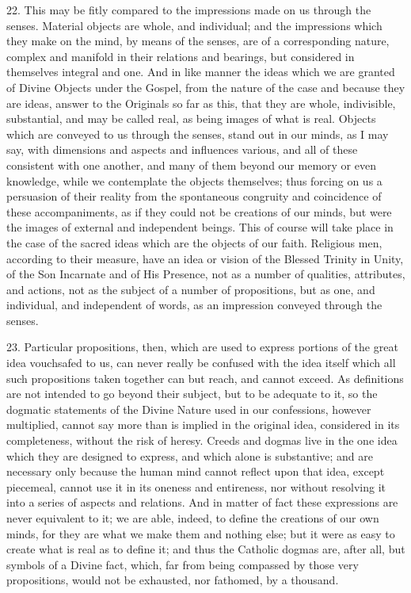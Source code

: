 22. This may be fitly compared to the impressions made on us
through the senses. Material objects are whole, and individual; and
the impressions which they make on the mind, by means of the senses,
are of a corresponding nature, complex and manifold in their relations
and bearings, but considered in themselves integral and one. And in
like manner the ideas which we are granted of Divine Objects under the
Gospel, from the nature of the case and because they are ideas, answer
to the Originals so far as this, that they are whole, indivisible,
substantial, and may be called real, as being images of what is real.
Objects which are conveyed to us through the senses, stand out in our
minds, as I may say, with dimensions and aspects and influences
various, and all of these consistent with one another, and many of
them beyond our memory or even knowledge, while we contemplate the
objects themselves; thus forcing on us a persuasion of their reality
from the spontaneous congruity and coincidence of these
accompaniments, as if they could not be creations of our minds, but
were the images of external and independent beings. This of course
will take place in the case of the sacred ideas which are the objects
of our faith. Religious men, according to their measure, have an idea
or vision of the Blessed Trinity in Unity, of the Son Incarnate and of
His Presence, not as a number of qualities, attributes, and actions,
not as the subject of a number of propositions, but as one, and
individual, and independent of words, as an impression conveyed
through the senses.

23. Particular propositions, then, which are used to express
portions of the great idea vouchsafed to us, can never really be
confused with the idea itself which all such propositions taken
together can but reach, and cannot exceed. As definitions are not
intended to go beyond their subject, but to be adequate to it, so the
dogmatic statements of the Divine Nature used in our confessions,
however multiplied, cannot say more than is implied in the original
idea, considered in its completeness, without the risk of heresy.
Creeds and dogmas live in the one idea which they are designed to
express, and which alone is substantive; and are necessary only
because the human mind cannot reflect upon that idea, except
piecemeal, cannot use it in its oneness and entireness, nor without
resolving it into a series of aspects and relations. And in matter of
fact these expressions are never equivalent to it; we are able,
indeed, to define the creations of our own minds, for they are what we
make them and nothing else; but it were as easy to create what is real
as to define it; and thus the Catholic dogmas are, after all, but
symbols of a Divine fact, which, far from being compassed by those
very propositions, would not be exhausted, nor fathomed, by a
thousand.

